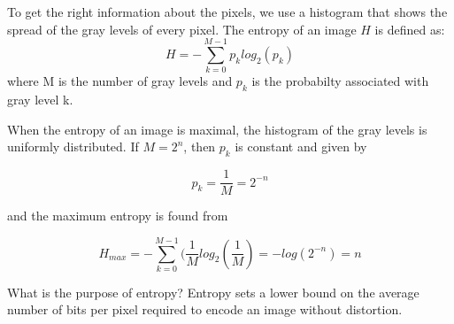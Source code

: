 \documentclass[12pt]{article}
\begin{document}
To get the right information about the pixels, we use a histogram that shows the spread of the gray levels of every pixel. 
\newline
\newline
The entropy of an image $H$ is defined as:
\begin{equation}
H = - \sum_{k=0}^{M-1} p_k log_2 (p_k)
\end{equation}
where M is the number of gray levels and $p_k$ is the probabilty associated with gray level k.

When the entropy of an image is maximal, the histogram of the gray levels is uniformly distributed. If $M = 2^n$, then $p_k$ is constant and given by

\begin{equation}
p_k = \frac{1}{M} = 2^{-n}
\end{equation}

and the maximum entropy is found from

\begin{equation}
H_{max} = -\sum_{k=0}^{M-1} (\frac{1}{M} log_2(\frac{1}{M}) = -log(2^{-n}) = n 
\end{equation}

What is the purpose of entropy? Entropy sets a lower bound on the average number of bits per pixel required to encode an image without distortion. 
\end{document}
